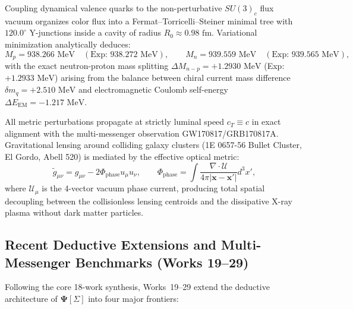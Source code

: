 \documentclass[11pt,a4paper]{article}
\theoremstyle{definition}
\begin{document}
\begin{theorembox}
Coupling dynamical valence quarks to the non-perturbative $SU(3)_c$ flux vacuum organizes color flux into a Fermat--Torricelli--Steiner minimal tree with $120.0^\circ$ Y-junctions inside a cavity of radius $R_0 \approx 0.98\text{ fm}$. Variational minimization analytically deduces:
\begin{equation}
M_p = 938.266\text{ MeV} \quad (\text{Exp: } 938.272\text{ MeV}), \qquad M_n = 939.559\text{ MeV} \quad (\text{Exp: } 939.565\text{ MeV}),
\end{equation}
with the exact neutron-proton mass splitting $\Delta M_{n-p} = +1.2930\text{ MeV}$ (Exp: $+1.2933\text{ MeV}$) arising from the balance between chiral current mass difference $\delta m_q = +2.510\text{ MeV}$ and electromagnetic Coulomb self-energy $\Delta E_{\mathrm{EM}} = -1.217\text{ MeV}$.
\end{theorembox}

\begin{theorembox}
All metric perturbations propagate at strictly luminal speed $c_T \equiv c$ in exact alignment with the multi-messenger observation GW170817/GRB170817A. Gravitational lensing around colliding galaxy clusters (1E 0657-56 Bullet Cluster, El Gordo, Abell 520) is mediated by the effective optical metric:
\begin{equation}
\tilde{g}_{\mu\nu} = g_{\mu\nu} - 2\Phi_{\mathrm{phase}} u_\mu u_\nu, \qquad \Phi_{\mathrm{phase}} = \int \frac{\nabla \cdot \mathcal{U}}{4\pi |\mathbf{x} - \mathbf{x}'|} d^3x',
\end{equation}
where $\mathcal{U}_\mu$ is the 4-vector vacuum phase current, producing total spatial decoupling between the collisionless lensing centroids and the dissipative X-ray plasma without dark matter particles.
\end{theorembox}

\subsection{Recent Deductive Extensions and Multi-Messenger Benchmarks (Works 19--29)}
\label{sec:recent_extensions}

Following the core 18-work synthesis, Works~19--29 extend the deductive architecture of $\mathbf{\Psi}[\Sigma]$ into four major frontiers:
\end{document}
